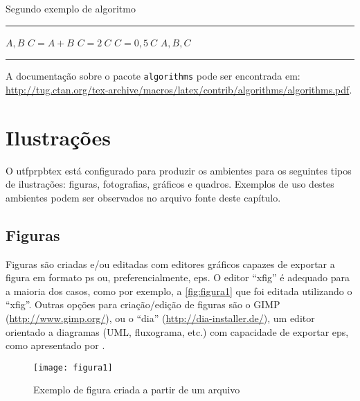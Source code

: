 \begin{algorithm}[htb]%
\caption{Segundo exemplo de algoritmo}%
\label{alg:algoritmo2}%
\hrule
\begin{algorithmic}[1]%
\ENSURE $A, B$
\STATE $C = A + B$
\STATE $C = 2 \ C$
\ELSE
\STATE $C = 0,5 \ C$
\ENDIF
\PRINT $A, B, C$
\end{algorithmic}
\hrule
\fonte{}%
\end{algorithm}

A documentação sobre o pacote \texttt{algorithms} pode ser encontrada em: \url{http://tug.ctan.org/tex-archive/macros/latex/contrib/algorithms/algorithms.pdf}.

\section{Ilustrações}\label{sec:ilustracoes}

O \gls{utfprpbtex} está configurado para produzir os ambientes para os seguintes tipos de ilustrações: figuras, fotografias, gráficos e quadros. Exemplos de uso destes ambientes podem ser observados no arquivo fonte deste capítulo.

\subsection{Figuras}\label{sec:figuras}

Figuras são criadas e/ou editadas com editores gráficos capazes de exportar a figura em formato \gls{ps} ou, preferencialmente, \gls{eps}. O editor ``xfig'' é adequado para a maioria dos casos, como por exemplo, a \autoref{fig:figura1} que foi editada utilizando o ``xfig''. Outras opções para criação/edição de figuras são o GIMP (\url{http://www.gimp.org/}), ou o ``dia'' (\url{http://dia-installer.de/}), um editor orientado a diagramas (UML, fluxograma, etc.) com capacidade de exportar \gls{eps}, como apresentado por \citet{Larsson2003}.

\begin{figure}[htb]%
\caption{Exemplo de figura criada a partir de um arquivo}%
\label{fig:figura1}%
\texttt{[image: figura1]}%
\end{figure}

